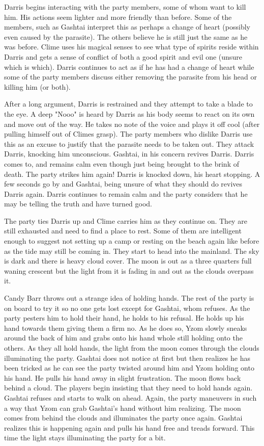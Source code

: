 Darris begins interacting with the party members, some of whom want to kill him. His actions seem lighter and more friendly than before. Some of the members, such as Gashtai interpret this as perhaps a change of heart (possibly even caused by the parasite). The others believe he is still just the same as he was before. Clime uses his magical senses to see what type of spirits reside within Darris and gets a sense of conflict of both a good spirit and evil one (unsure which is which). Darris continues to act as if he has had a change of heart while some of the party members discuss either removing the parasite from his head or killing him (or both).

After a long argument, Darris is restrained and they attempt to take a blade to the eye. A deep "Nooo" is heard by Darris as his body seems to react on its own and move out of the way. He takes no note of the voice and plays it off cool (after pulling himself out of Climes grasp). The party members who dislike Darris use this as an excuse to justify that the parasite needs to be taken out. They attack Darris, knocking him unconscious. Gashtai, in his concern revives Darris. Darris comes to, and remains calm even though just being brought to the brink of death. The party strikes him again! Darris is knocked down, his heart stopping. A few seconds go by and Gashtai, being unsure of what they should do revives Darris again. Darris continues to remain calm and the party considers that he may be telling the truth and have turned good. 

The party ties Darris up and Clime carries him as they continue on. They are still exhausted and need to find a place to rest. Some of them are intelligent enough to suggest not setting up a camp or resting on the beach again like before as the tide may still be coming in. They start to head into the mainland. The sky is dark and there is heavy cloud cover. The moon is out as a three quarters full waning crescent but the light from it is fading in and out as the clouds overpass it. 

Candy Barr throws out a strange idea of holding hands. The rest of the party is on board to try it so no one gets lost except for Gashtai, whom refuses. As the party pesters him to hold their hand, he holds to his refusal. He holds up his hand towards them giving them a firm no. As he does so, Yzom slowly sneaks around the back of him and grabs onto his hand whole still holding onto the others. As they all hold hands, the light from the moon comes through the clouds illuminating the party. Gashtai does not notice at first but then realizes he has been tricked as he can see the party twisted around him and Yzom holding onto his hand. He pulls his hand away in slight frustration. The moon flows back behind a cloud. The players begin insisting that they need to hold hands again. Gashtai refuses and starts to walk on ahead. Again, the party maneuvers in such a way that Yzom can grab Gashtai's hand without him realizing. The moon comes from behind the clouds and illuminates the party once again. Gashtai realizes this is happening again and pulls his hand free and treads forward. This time the light stays illuminating the party for a bit.

